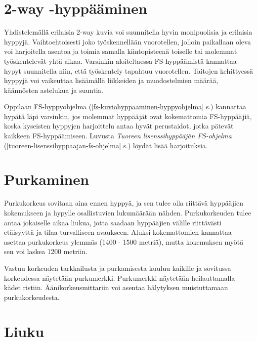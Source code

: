 \section{ 2-way -hyppääminen }
\label{vapaapudotusharjoittelu-2-way-hyppaaminen}


Yhdistelemällä erilaisia 2-way kuvia voi suunnitella hyvin monipuolisia ja erilaisia hyppyjä. Vaihtoehtoisesti joko työskennellään vuorotellen, jolloin paikallaan oleva voi harjoitella asentoa ja toimia samalla kiintopisteenä toiselle tai molemmat työskentelevät yhtä aikaa. Varsinkin aloiteltaessa FS-hyppäämistä kannattaa hypyt suunnitella niin, että työskentely tapahtuu vuorotellen. Taitojen kehittyessä hyppyjä voi vaikeuttaa lisäämällä liikkeiden ja muodostelmien määrää, käännösten astelukua ja suuntia.  


Oppilaan FS-hyppyohjelma (\ref{fs-kuviohyppaaminen-hyppyohjelma} s.\pageref{fs-kuviohyppaaminen-hyppyohjelma}) kannattaa hypätä läpi varsinkin, jos molemmat hyppääjät ovat kokemattomia FS-hyppääjiä, koska kyseisten hyppyjen harjoittelu antaa hyvät perustaidot, jotka pätevät kaikkeen FS-hyppäämiseen. Luvusta \textit{Tuoreen lisenssihyppääjän FS-ohjelma} (\ref{tuoreen-lisenssihyppaajan-fs-ohjelma} s.\pageref{tuoreen-lisenssihyppaajan-fs-ohjelma}) löydät lisää harjoituksia. 

\section{ Purkaminen }
\label{vapaapudotusharjoittelu-purkaminen}


Purkukorkeus sovitaan aina ennen hyppyä, ja sen tulee olla riittävä hyppääjien kokemukseen ja hypylle osallistuvien lukumäärään nähden. Purkukorkeuden tulee antaa jokaiselle aikaa liukua, jotta saadaan hyppääjien välille riittävästi etäisyyttä ja tilaa turvalliseen avaukseen. Aluksi kokemattomien kannattaa asettaa purkukorkeus ylemmäs (1400 - 1500 metriä), mutta kokemuksen myötä sen voi laskea 1200 metriin. 


Vastuu korkeuden tarkkailusta ja purkamisesta kuuluu kaikille ja sovitussa korkeudessa näytetään purkumerkki. Purkumerkki näytetään heilauttamalla kädet ristiin. Äänikorkeusmittariin voi asentaa hälytyksen muistuttamaan purkukorkeudesta. 

\section{ Liuku }
\label{vapaapudotusharjoittelu-liuku}



